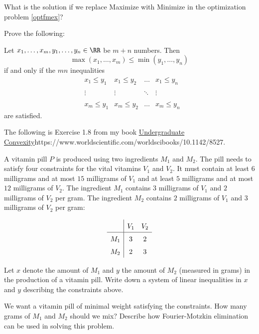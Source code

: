 \documentclass{article}
\begin{document}
\beginshex
What is the solution if we replace Maximize with Minimize in the optimization problem \eqref{optfmex}?
\endshex

  

\beginshex\label{explex}

Prove the following:

    Let $x_1, \dots, x_m, y_1, \dots, y_n\in \RR$ be $m + n$ numbers. Then
    $$
    \max(x_1, \dots, x_m) \leq \min(y_1, \dots, y_n)
    $$
    if and only if the $m n$ inequalities
    $$
    \begin{matrix}
      &x_1 \leq y_1 &x_1 \leq y_2 &\dots &x_1\leq y_n\\
      \\
      &\vdots & \vdots &\ddots &\vdots\\
      \\
      &x_m \leq y_1 &x_m \leq y_2 &\dots &x_m\leq y_n
    \end{matrix}
    $$
    are satisfied.
\endshex

\beginshex

The following is Exercise 1.8 from my book \url{Undergraduate Convexity}{https://www.worldscientific.com/worldscibooks/10.1142/8527}.

A vitamin pill $P$ is produced using two ingredients $M_1$
  and $M_2$. The pill needs to satisfy four constraints for the vital
  vitamins $V_1$ and $V_2$. It must contain at least $6$ milligrams and
  at most $15$ milligrams of $V_1$ and at least $5$ milligrams and at
  most $12$ milligrams of $V_2$. The ingredient $M_1$ contains $3$
  milligrams of $V_1$ and $2$ milligrams of $V_2$ per gram.  The
  ingredient $M_2$ contains $2$ milligrams of $V_1$ and $3$ milligrams
  of $V_2$ per gram:

$$
\def\arraystretch{1.5}
\begin{array}{c|cc}
& V_1 & V_2\\ \hline
M_1 & 3 & 2\\
M_2 & 2 & 3
\end{array}
$$


Let $x$ denote the amount of $M_1$ and $y$ the amount of $M_2$
  (measured in grams) in the production of a vitamin pill. Write down
  a system of linear inequalities in $x$ and $y$ describing the
  constraints above.

  We want a vitamin pill of minimal weight satisfying the
  constraints. How many grams of $M_1$ and $M_2$ should we mix?
  Describe how Fourier-Motzkin elimination can be used in solving this
  problem.
\end{document}
